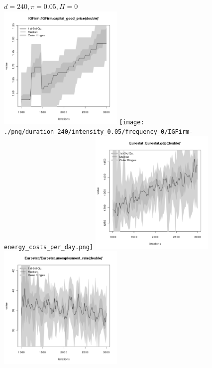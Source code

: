 \begin{figure}[ht!]
\centering\leavevmode
\begin{minipage}{13cm}
\centering\leavevmode
{$d=240, \pi=0.05, \Pi=0$}\\
\includegraphics[width=6cm]{./png/duration_240/intensity_0.05/frequency_0/IGFirm-capital_good_price.png}
\texttt{[image: ./png/duration\_240/intensity\_0.05/frequency\_0/IGFirm-energy\_costs\_per\_day.png]}
\includegraphics[width=6cm]{./png/duration_240/intensity_0.05/frequency_0/Eurostat-gdp.png}
\includegraphics[width=6cm]{./png/duration_240/intensity_0.05/frequency_0/Eurostat-unemployment_rate.png}
\end{minipage}
\end{figure}

